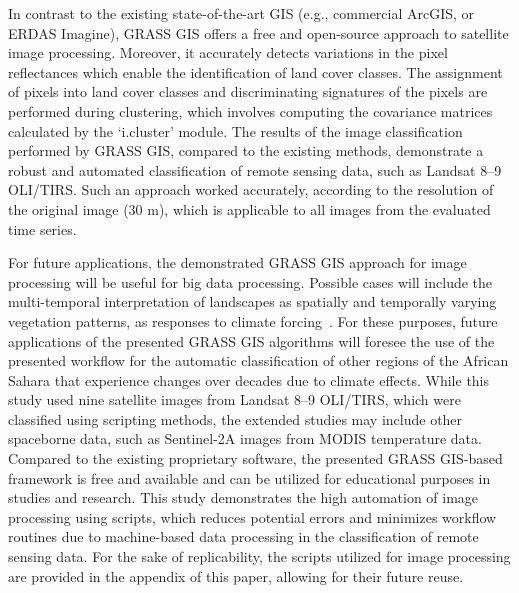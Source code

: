 \documentclass[asi,article,accept,pdftex,moreauthors]{Definitions/mdpi}
\begin{document}
In contrast to the existing state-of-the-art GIS (e.g., {commercial }ArcGIS, or ERDAS Imagine), GRASS GIS offers a free and open-source approach to satellite image processing. Moreover, it accurately detects variations in the pixel reflectances {which enable the identification of land cover classes. The assignment of pixels} into land cover classes {and} discriminating signatures of the pixels {are performed during clustering, which involves computing the }covariance matrices calculated by the  `i.cluster' module. The results of the image classification performed by GRASS GIS, compared to the {existing} methods, demonstrate a robust and automated classification of remote sensing data, such as Landsat {8--9 }OLI/TIRS{. Such an approach} worked accurately, according to the resolution of the original image (30 m), which is applicable to all images from the evaluated time series. 

{For future applications, }the demonstrated GRASS GIS approach for image processing will be useful {for} big data {processing. Possible cases will include the }multi-temporal interpretation of landscapes {as spatially and temporally varying vegetation patterns, as responses to climate forcing}~\cite{McDermid,Peteretal2020,Pengetal2020}. For these purposes, future applications of the presented GRASS GIS algorithms will foresee the use of the presented workflow for the automatic classification of other regions of the African Sahara { that experience changes over decades due to  climate effects. While this study used nine} satellite images from Landsat 8--9 OLI/TIRS, {which }were classified using scripting methods{, the extended studies may include other spaceborne data, such as Sentinel-2A images from MODIS temperature data}. Compared to the existing {proprietary} software, the presented GRASS GIS-based framework {is free and available and can be utilized for educational purposes in studies and research. This study }demonstrates the high automation of image processing {using scripts, }which reduces potential errors {and minimizes workflow routines due to} machine-based {data processing} in the classification of remote sensing data.{ For the sake of replicability, the scripts utilized for image processing are provided in the appendix of this paper, allowing for their future reuse.}
\end{document}
